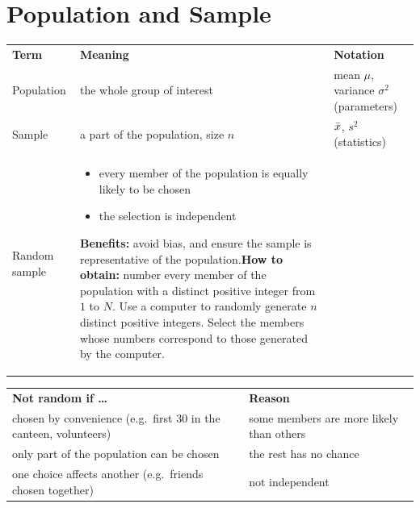 \clearpage
{}
\section{Population and Sample}
\begin{center}\ba\small
\begin{tabular}{|M{3.8cm}|L{7.2cm}|L{4.2cm}|}\hline
\textbf{Term} & \textbf{Meaning} & \textbf{Notation}\\\Xhline{2pt}
Population & the whole group of interest & mean $\mu$, variance $\sigma^{2}$ (parameters)\\\hline
Sample & a part of the population, size $n$ & $\bar{x}$, $s^{2}$ (statistics)\\\hline
Random sample & \begin{itemize}[leftmargin=*,nosep,before=\vspace{3pt}]\item every member of the population is equally likely to be chosen\item the selection is independent\end{itemize}\textbf{Benefits:} avoid bias, and ensure the sample is representative of the population.\newline \textbf{How to obtain:} number every member of the population with a distinct positive integer from $1$ to $N$. Use a computer to randomly generate $n$ distinct positive integers. Select the members whose numbers correspond to those generated by the computer. & \\\hline
\end{tabular}\end{center}
\begin{center}\ba\small
\begin{tabular}{|L{7.2cm}|L{8.0cm}|}\hline
\textbf{Not random if \ldots} & \textbf{Reason}\\\Xhline{2pt}
chosen by convenience (e.g.\ first 30 in the canteen, volunteers) & some members are more likely than others\\\hline
only part of the population can be chosen & the rest has no chance\\\hline
one choice affects another (e.g.\ friends chosen together) & not independent\\\hline
\end{tabular}\end{center}

